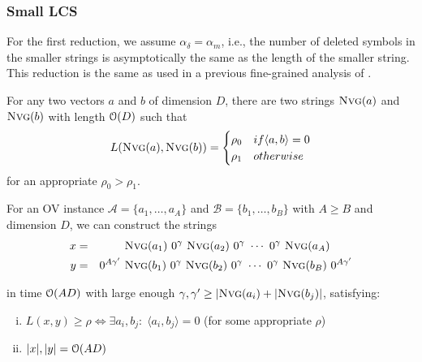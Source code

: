 \subsubsection{Small LCS}
For the first reduction, we assume $\alpha_\delta = \alpha_m$, i.e., the number of deleted symbols in the smaller strings is asymptotically the same as the length of the smaller string.
This reduction is the same as used in a previous fine-grained analysis of \lcs{} \cite{Bringmann.2015}.




\begin{theorem}
For any two vectors $a$ and $b$ of dimension $D$, there are two strings $\text{\textsc{Nvg}}(a)$ and $\text{\textsc{Nvg}}(b)$ with length $\mathcal{O}(D)$ such that
\[
L(\text{\textsc{Nvg}}(a), \text{\textsc{Nvg}}(b)) = \begin{cases}
		\rho_0 & if \langle a, b \rangle = 0\\
		\rho_1 & otherwise
	\end{cases}
\]
for an appropriate $\rho_0 > \rho_1$.
\end{theorem}


\begin{theorem}
	For an OV instance $\mathcal{A} = \{a_1, \ldots, a_A\}$ and $\mathcal{B} = \{b_1, \ldots, b_B\}$ with $A \geq B$ and dimension $D$, we can construct the strings
\begin{align*}
	x &=& &\nvg{a_1}\ 0^\gamma\ \nvg{a_2}\ 0^\gamma\ \cdots\ 0^\gamma\ \nvg{a_A}\\
	y&=& 0^{A\gamma'}\ &\nvg{b_1}\ 0^{\gamma}\ \nvg{b_2}\ 0^\gamma\ \cdots\ 0^\gamma\ \nvg{b_B}\ 0^{A\gamma'}
\end{align*}

in time $\mathcal{O}(AD)$ with large enough $\gamma, \gamma' \geq |\text{\textsc{Nvg}}(a_i) + |\text{\textsc{Nvg}}(b_j)|$, satisfying:

\begin{enumerate}[(i)]
    \item $L(x,y) \geq \rho \Leftrightarrow \exists a_i, b_j:\; \langle a_i,b_j \rangle = 0$ \quad\quad (for some appropriate $\rho$)

    \item $|x|, |y| = \mathcal{O}(AD)$
\end{enumerate}
\end{theorem}	




